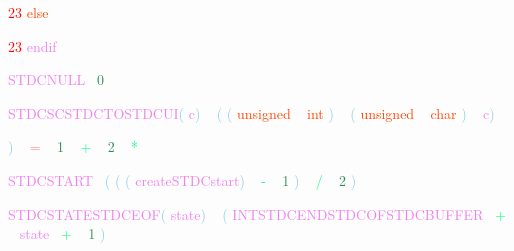 \documentclass[8, usernames, dvipsnames]{beamer}
\begin{document}
\begin{frame}
 \textcolor{Red}{23}
\textcolor{OrangeRed}{else}

 
  \textcolor{Red}{23}
\textcolor{Violet}{endif}
 
 
 \textcolor{Violet}{STDCNULL}\textcolor{White}{\ }
\textcolor{SeaGreen}{0}

 
 
 \textcolor{Violet}{STDCSCSTDCTOSTDCUI}\textcolor{SkyBlue}{(}
\textcolor{Violet}{c}\textcolor{SkyBlue}{)}
\textcolor{White}{\ }
\textcolor{SkyBlue}{(}
\textcolor{SkyBlue}{(}
\textcolor{OrangeRed}{unsigned}
\textcolor{White}{\ }
\textcolor{OrangeRed}{int}
\textcolor{SkyBlue}{)}
\textcolor{White}{\ }
\textcolor{SkyBlue}{(}
\textcolor{OrangeRed}{unsigned}
\textcolor{White}{\ }
\textcolor{OrangeRed}{char}
\textcolor{SkyBlue}{)}
\textcolor{White}{\ }
\textcolor{Violet}{c}\textcolor{SkyBlue}{)}

 
 \end{frame}
\begin{frame}

 \textcolor{SkyBlue}{)}
\textcolor{White}{\ }
\textcolor{Salmon}{=}
\textcolor{White}{\ }
\textcolor{SeaGreen}{1}
\textcolor{White}{\ }
\textcolor{SpringGreen}{+}
\textcolor{White}{\ }
\textcolor{SeaGreen}{2}
\textcolor{White}{\ }
\textcolor{SpringGreen}{*}

 
 
 \textcolor{Violet}{STDCSTART}\textcolor{White}{\ }
\textcolor{SkyBlue}{(}
\textcolor{SkyBlue}{(}
\textcolor{SkyBlue}{(}
\textcolor{Violet}{createSTDCstart}\textcolor{SkyBlue}{)}
\textcolor{White}{\ }
\textcolor{SpringGreen}{-}
\textcolor{White}{\ }
\textcolor{SeaGreen}{1}
\textcolor{SkyBlue}{)}
\textcolor{White}{\ }
\textcolor{SpringGreen}{/}
\textcolor{White}{\ }
\textcolor{SeaGreen}{2}
\textcolor{SkyBlue}{)}

 
 
 \textcolor{Violet}{STDCSTATESTDCEOF}\textcolor{SkyBlue}{(}
\textcolor{Violet}{state}\textcolor{SkyBlue}{)}
\textcolor{White}{\ }
\textcolor{SkyBlue}{(}
\textcolor{Violet}{INTSTDCENDSTDCOFSTDCBUFFER}\textcolor{White}{\ }
\textcolor{SpringGreen}{+}
\textcolor{White}{\ }
\textcolor{Violet}{state}\textcolor{White}{\ }
\textcolor{SpringGreen}{+}
\textcolor{White}{\ }
\textcolor{SeaGreen}{1}
\textcolor{SkyBlue}{)}

 
 
 \end{frame}
\end{document}
